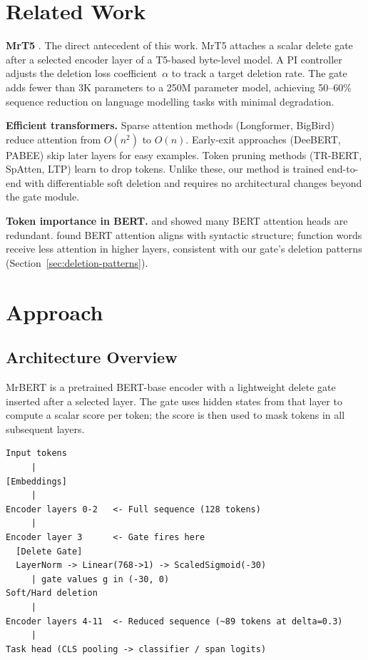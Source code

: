 \documentclass[11pt,a4paper]{article}
\begin{document}
\section{Related Work}
\label{sec:related-work}

\textbf{MrT5} \citep{kallini2024mrt5}. The direct antecedent of this work. MrT5 attaches a scalar delete gate after a selected encoder layer of a T5-based byte-level model. A PI controller adjusts the deletion loss coefficient~$\alpha$ to track a target deletion rate. The gate adds fewer than 3K parameters to a 250M parameter model, achieving 50--60\% sequence reduction on language modelling tasks with minimal degradation.

\textbf{Efficient transformers.} Sparse attention methods (Longformer, BigBird) reduce attention from $O(n^2)$ to $O(n)$. Early-exit approaches (DeeBERT, PABEE) skip later layers for easy examples. Token pruning methods (TR-BERT, SpAtten, LTP) learn to drop tokens. Unlike these, our method is trained end-to-end with differentiable soft deletion and requires no architectural changes beyond the gate module.

\textbf{Token importance in BERT.} \citet{michel2019heads} and \citet{voita2019heads} showed many BERT attention heads are redundant. \citet{clark2019attention} found BERT attention aligns with syntactic structure; function words receive less attention in higher layers, consistent with our gate's deletion patterns (Section~\ref{sec:deletion-patterns}).


\section{Approach}
\label{sec:approach}

\subsection{Architecture Overview}

MrBERT is a pretrained BERT-base encoder with a lightweight delete gate inserted after a selected layer. The gate uses hidden states from that layer to compute a scalar score per token; the score is then used to mask tokens in all subsequent layers.

\begin{lstlisting}
Input tokens
     |
[Embeddings]
     |
Encoder layers 0-2   <- Full sequence (128 tokens)
     |
Encoder layer 3      <- Gate fires here
  [Delete Gate]
  LayerNorm -> Linear(768->1) -> ScaledSigmoid(-30)
     | gate values g in (-30, 0)
Soft/Hard deletion
     |
Encoder layers 4-11  <- Reduced sequence (~89 tokens at delta=0.3)
     |
Task head (CLS pooling -> classifier / span logits)
\end{lstlisting}
\end{document}
